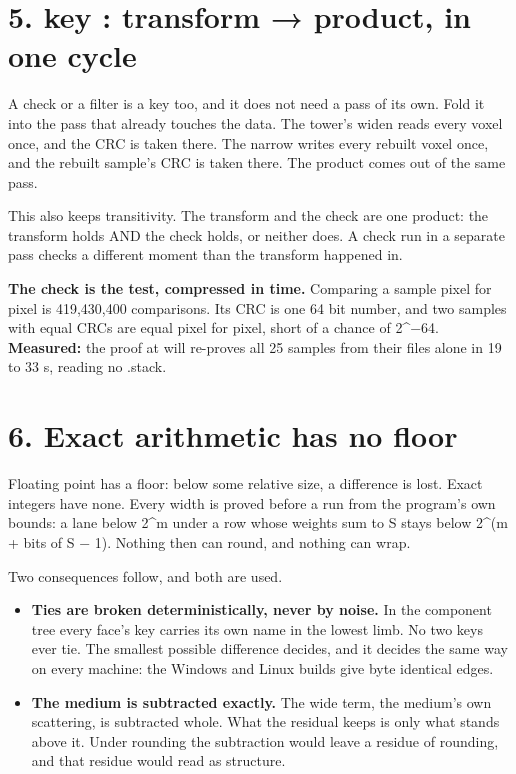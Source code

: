 \section{\texorpdfstring{5. key : transform → product, in one cycle}{5. key : transform → product, in one cycle}}

A check or a filter is a key too, and it does not need a pass of its own. Fold it into the pass that already touches the data. The tower's widen reads every voxel once, and the CRC is taken there. The narrow writes every rebuilt voxel once, and the rebuilt sample's CRC is taken there. The product comes out of the same pass.

This also keeps transitivity. The transform and the check are one product: the transform holds AND the check holds, or neither does. A check run in a separate pass checks a different moment than the transform happened in.

\textbf{The check is the test, compressed in time.} Comparing a sample pixel for pixel is 419,430,400 comparisons. Its CRC is one 64 bit number, and two samples with equal CRCs are equal pixel for pixel, short of a chance of 2\textasciicircum{}−64. \textbf{Measured:} the proof at will re-proves all 25 samples from their files alone in 19 to 33 s, reading no .stack.

\section{\texorpdfstring{6. Exact arithmetic has no floor}{6. Exact arithmetic has no floor}}

Floating point has a floor: below some relative size, a difference is lost. Exact integers have none. Every width is proved before a run from the program's own bounds: a lane below 2\textasciicircum{}m under a row whose weights sum to S stays below 2\textasciicircum{}(m + bits of S − 1). Nothing then can round, and nothing can wrap.

Two consequences follow, and both are used.

\begin{itemize}
\item \textbf{Ties are broken deterministically, never by noise.} In the component tree every face's key carries its own name in the lowest limb. No two keys ever tie. The smallest possible difference decides, and it decides the same way on every machine: the Windows and Linux builds give byte identical edges.
\item \textbf{The medium is subtracted exactly.} The wide term, the medium's own scattering, is subtracted whole. What the residual keeps is only what stands above it. Under rounding the subtraction would leave a residue of rounding, and that residue would read as structure.
\end{itemize}

